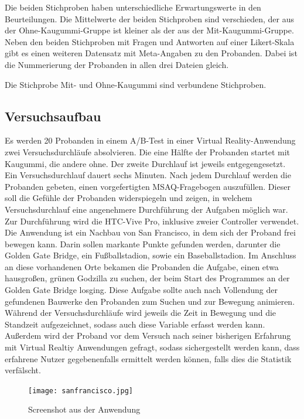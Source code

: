 \documentclass[conference]{IEEEtran}
\begin{document}
Die beiden Stichproben haben unterschiedliche Erwartungswerte in den Beurteilungen. Die Mittelwerte der beiden Stichproben sind verschieden, der aus der Ohne-Kaugummi-Gruppe ist kleiner als der aus der Mit-Kaugummi-Gruppe. Neben den beiden Stichproben mit Fragen und Antworten auf einer Likert-Skala gibt es einen weiteren Datensatz mit Meta-Angaben zu den Probanden. Dabei ist die Nummerierung der Probanden in allen drei Dateien gleich.

Die Stichprobe Mit- und Ohne-Kaugummi sind verbundene Stichproben.

\subsection{Versuchsaufbau}
Es werden 20 Probanden in einem A/B-Test in einer Virtual Reality-Anwendung zwei Versuchsdurchläufe absolvieren. Die eine Hälfte der Probanden startet mit Kaugummi, die andere ohne. Der zweite Durchlauf ist jeweils entgegengesetzt. Ein Versuchsdurchlauf dauert sechs Minuten. Nach jedem Durchlauf werden die Probanden gebeten, einen vorgefertigten MSAQ-Fragebogen auszufüllen. Dieser soll die Gefühle der Probanden widerspiegeln und zeigen, in welchem Versuchsdurchlauf eine angenehmere Durchführung der Aufgaben möglich war. Zur Durchführung wird die HTC-Vive Pro, inklusive zweier Controller verwendet. Die Anwendung ist ein Nachbau von San Francisco, in dem sich der Proband frei bewegen kann. Darin sollen markante Punkte gefunden werden, darunter die Golden Gate Bridge, ein Fußballstadion, sowie ein Baseballstadion. Im Anschluss an diese vorhandenen Orte bekamen die Probanden die Aufgabe, einen etwa hausgroßen, grünen Godzilla zu suchen, der beim Start des Programmes an der Golden Gate Bridge losging. Diese Aufgabe sollte auch nach Vollendung der gefundenen Bauwerke den Probanden zum Suchen und zur Bewegung animieren. Während der Versuchsdurchläufe wird jeweils die Zeit in Bewegung und die Standzeit aufgezeichnet, sodass auch diese Variable erfasst werden kann. Außerdem wird der Proband vor dem Versuch nach seiner bisherigen Erfahrung mit Virtual Realtiy Anwendungen gefragt, sodass sichergestellt werden kann, dass erfahrene Nutzer gegebenenfalls ermittelt werden können, falls dies die Statistik verfälscht. 
\\
\begin{figure}
	\centering
	\texttt{[image: sanfrancisco.jpg]}
	\caption{Screenshot aus der Anwendung}
	\label{img:screenshot}
\end{figure}
\end{document}

